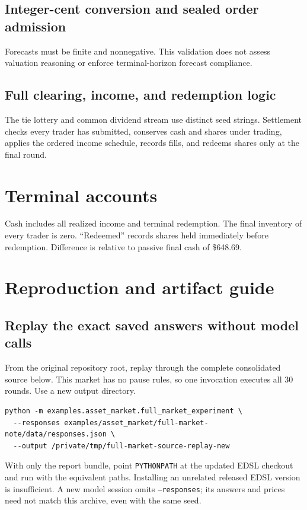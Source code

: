 \documentclass[11pt,letterpaper]{article}
\newcommand{\code}[1]{\texttt{\small #1}}
\begin{document}
\subsection{Integer-cent conversion and sealed order admission}
Forecasts must be finite and nonnegative. This validation does not assess
valuation reasoning or enforce terminal-horizon forecast compliance.
\MarketAdmission

\subsection{Full clearing, income, and redemption logic}
The tie lottery and common dividend stream use distinct seed strings.
Settlement checks every trader has submitted, conserves cash and shares under
trading, applies the ordered income schedule, records fills, and redeems shares
only at the final round.
\MarketSettlement

\Needspace{0.30\textheight}
\section{Terminal accounts}\label{app:wealth}
Cash includes all realized income and terminal redemption. The final inventory
of every trader is zero. ``Redeemed'' records shares held immediately before
redemption. Difference is relative to passive final cash of \$648.69.



\clearpage
\begingroup\small
\section{Reproduction and artifact guide}\label{app:reproduce}
\subsection{Replay the exact saved answers without model calls}
From the original repository root, replay through the complete consolidated
source below. This market has no pause rules, so one invocation executes all
30 rounds. Use a new output directory.
\begin{lstlisting}[language={},numbers=none]
python -m examples.asset_market.full_market_experiment \
  --responses examples/asset_market/full-market-note/data/responses.json \
  --output /private/tmp/full-market-source-replay-new
\end{lstlisting}
With only the report bundle, point \code{PYTHONPATH} at the updated EDSL
checkout and run  with the equivalent
paths. Installing an unrelated released EDSL version is insufficient.
A new model session omits \code{--responses}; its answers and prices need
not match this archive, even with the same seed.
\end{document}
